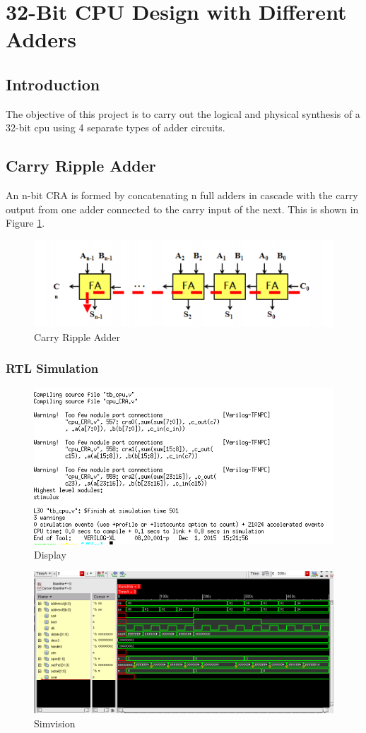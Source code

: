 \documentclass[12pt]{article}
\begin{document}
\section{32-Bit CPU Design with Different Adders}

\subsection{Introduction}
The objective of this project is to carry out the logical and physical synthesis of a 32-bit cpu using 4 separate types of adder circuits. 
\subsection{Carry Ripple Adder}
An n-bit CRA is formed by concatenating n full adders in cascade with the carry output from one adder connected to the carry input of the next. This is shown in Figure \ref{fig:carry-ripple}.
\begin{figure}[H]
\centering
\includegraphics[width=0.7\linewidth]{carry-ripple}
\caption{Carry Ripple Adder}
\label{fig:carry-ripple}
\end{figure}

\subsubsection{RTL Simulation}
\begin{figure}[H]
\centering
\includegraphics[width=.7\linewidth]{../CRA/CRA-text}
\caption{Display}
\label{fig:CRA-text}
\end{figure}
\begin{figure}[H]
\centering
\includegraphics[width=\linewidth]{../CRA/CRA-test}
\caption{Simvision}
\label{fig:CRA-test}
\end{figure}
\end{document}
